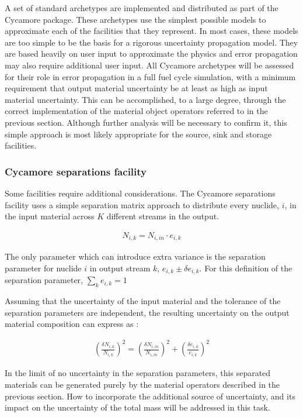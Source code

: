 \documentclass[dvips,12pt]{article}
\newcommand{\unc}[1]
{ \delta #1 }
\newcommand{\uncratio}[1]
{ \left(\frac{\unc{#1}}{#1}\right) }
\newcommand{\uncratiosq}[1]
{ \uncratio{#1}^2 }
\begin{document}
A set of standard archetypes are implemented and
distributed as part of the Cycamore package.
These archetypes use the simplest possible models
to approximate each of the facilities that they
represent.  In most cases, these models are too
simple to be the basis for a rigorous uncertainty
propagation model.  They are based heavily on user
input to approximate the physics and error
propagation may also require additional user
input.  All Cycamore archetypes will be assessed
for their role in error propagation in a full fuel
cycle simulation, with a minimum requirement that
output material uncertainty be at least as high as
input material uncertainty.  This can be
accomplished, to a large degree, through the
correct implementation of the material object
operators referred to in the previous section.
Although further analysis will be necessary to
confirm it, this simple approach is most likely
appropriate for the source, sink
and storage facilities.

\subsubsection{Cycamore separations facility}

Some facilities require additional considerations.
The Cycamore separations facility uses a simple
separation matrix approach to distribute every
nuclide, $i$, in the input material across $K$
different streams in the output.

\begin{align}
N_{i,k} = N_{i,in} \cdot e_{i,k}
\end{align}

The only parameter which can introduce extra
variance is the separation parameter for nuclide
$i$ in output stream $k$, $e_{i,k} \pm \delta
e_{i,k}$.  For this definition of the separation
parameter, $\sum_k e_{i,k} = 1$

Assuming that the uncertainty of the input
material and the tolerance of the separation
parameters are independent, the resulting
uncertainty on the output material composition can
express as :

\begin{align}
  \uncratiosq{N_{i,k}} = \uncratiosq{N_{i,in}} +  \uncratiosq{e_{i,k}}
\end{align}

In the limit of no uncertainty in the separation
parameters, this separated materials can be
generated purely by the material operators
described in the previous section.  How to
incorporate the additional source of uncertainty,
and its impact on the uncertainty of the total
mass will be addressed in this task.
\end{document}
